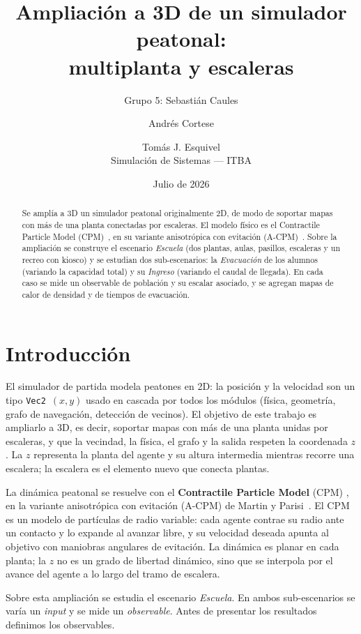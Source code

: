 \documentclass[11pt,a4paper]{article}
\title{\vspace{-1.2cm}\textbf{Ampliación a 3D de un simulador peatonal:\\ multiplanta y escaleras}}
\author{Grupo 5: Sebastián Caules \and Andrés Cortese \and Tomás J. Esquivel\\[2pt]
\normalsize Simulación de Sistemas --- ITBA}
\date{Julio de 2026}
\begin{document}
\maketitle
\vspace{-0.4cm}

\begin{abstract}
\noindent
Se amplía a 3D un simulador peatonal originalmente 2D, de modo de soportar mapas con
más de una planta conectadas por escaleras. El modelo físico es el Contractile Particle
Model (CPM)~\cite{baglietto2011}, en su variante anisotrópica con evitación
(A-CPM)~\cite{martin2024}. Sobre la ampliación se construye el escenario \emph{Escuela}
(dos plantas, aulas, pasillos, escaleras y un recreo con kiosco) y se estudian dos
sub-escenarios: la \emph{Evacuación} de los alumnos (variando la capacidad total) y su
\emph{Ingreso} (variando el caudal de llegada). En cada caso se mide un observable de
población y su escalar asociado, y se agregan mapas de calor de densidad y de tiempos de
evacuación.
\end{abstract}

\section{Introducción}
\label{sec:intro}

El simulador de partida modela peatones en 2D: la posición y la velocidad son un tipo
\texttt{Vec2}~$(x,y)$ usado en cascada por todos los módulos (física, geometría, grafo de
navegación, detección de vecinos). El objetivo de este trabajo es ampliarlo a 3D, es decir,
soportar mapas con más de una planta unidas por escaleras, y que la vecindad, la física, el
grafo y la salida respeten la coordenada $z$. La $z$ representa la planta del agente y su
altura intermedia mientras recorre una escalera; la escalera es el elemento nuevo que conecta
plantas.

La dinámica peatonal se resuelve con el \textbf{Contractile Particle Model} (CPM)
\cite{baglietto2011}, en la variante anisotrópica con evitación (A-CPM) de Martin y
Parisi~\cite{martin2024}. El CPM es un modelo de partículas de radio variable: cada agente
contrae su radio ante un contacto y lo expande al avanzar libre, y su velocidad deseada
apunta al objetivo con maniobras angulares de evitación. La dinámica es planar en cada planta;
la $z$ no es un grado de libertad dinámico, sino que se interpola por el avance del agente a
lo largo del tramo de escalera.

Sobre esta ampliación se estudia el escenario \emph{Escuela}. En ambos sub-escenarios se varía
un \emph{input} y se mide un \emph{observable}. Antes de presentar los resultados definimos los
observables.
\end{document}
